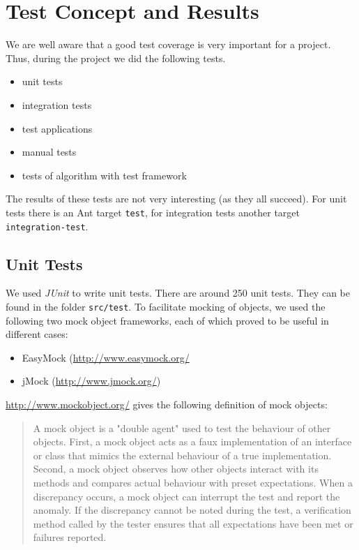 \chapter{Test Concept and Results}
\label{chapter:testing}

We are well aware that a good test coverage is very important for a
project. Thus, during the project we did the following tests.

\begin{itemize}
 \item unit tests
 \item integration tests
 \item test applications
 \item manual tests
 \item tests of algorithm with test framework
\end{itemize}

The results of these tests are not very interesting (as they all succeed).
For unit tests there is an Ant target \texttt{test}, for integration
tests another target \texttt{integration-test}. 


\section{Unit Tests}
We used \emph{JUnit} to write unit tests. There are around
250 unit tests. They can be found in the folder \texttt{src/test}.
To facilitate mocking of objects, we used the following two mock object
frameworks, each of which proved to be useful in different cases: 

\begin{itemize}
 \item EasyMock (\href{http://www.easymock.org/}{http://www.easymock.org/}
 \item jMock (\href{http://www.jmock.org/}{http://www.jmock.org/})
\end{itemize}

\href{http://www.mockobject.org/}{http://www.mockobject.org/} gives the
following definition of mock objects:

\begin{quote}
A mock object is a "double agent" used to test the behaviour of other objects. 
First, a mock object acts as a faux implementation of an interface or class that 
mimics the external behaviour of a true implementation. Second, a mock object 
observes how other objects interact with its methods and compares actual 
behaviour with preset expectations. When a discrepancy occurs, a mock object can 
interrupt the test and report the anomaly. If the discrepancy cannot be noted 
during the test, a verification method called by the tester ensures that all 
expectations have been met or failures reported.
\end{quote}

